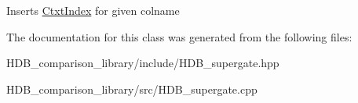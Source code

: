 Inserts \hyperlink{classHDB__supergate___1_1CtxtIndex}{Ctxt\+Index} for given colname 

The documentation for this class was generated from the following files\+:\begin{DoxyCompactItemize}
\item 
H\+D\+B\+\_\+comparison\+\_\+library/include/H\+D\+B\+\_\+supergate.\+hpp\item 
H\+D\+B\+\_\+comparison\+\_\+library/src/H\+D\+B\+\_\+supergate.\+cpp\end{DoxyCompactItemize}
